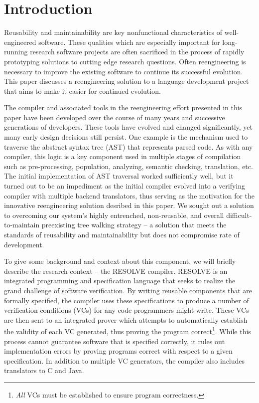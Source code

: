 \documentclass[times]{speauth}
\begin{document}

\section{Introduction}
\vspace{-2pt}
Reusability and maintainability are key nonfunctional characteristics of well-engineered software. These qualities which are especially important for long-running research software projects are often sacrificed in the process of rapidly prototyping solutions to cutting edge research questions. Often reengineering is necessary to improve the existing software to continue its successful evolution. This paper discusses a reengineering solution to a language development project that aims to make it easier for continued evolution.

The compiler and associated tools in the reengineering effort presented in this paper have been developed over the course of many years and successive generations of developers. These tools have evolved and changed significantly, yet many early design decisions still persist. One example is the mechanism used to traverse the abstract syntax tree (AST) that represents parsed code. As with any compiler, this logic is a key component used in multiple stages of compilation such as pre-processing, population, analyzing, semantic checking, translation, etc. The initial implementation of AST traversal worked sufficiently well, but it turned out to be an impediment as the initial compiler evolved into a verifying compiler with multiple backend translators, thus serving as the motivation for the innovative reengineering solution desribed in this paper. We sought out a solution to overcoming our system's highly entrenched, non-reusable, and overall difficult-to-maintain preexisting tree walking strategy -- a solution that meets the standards of reusability and maintainability but does not compromise rate of development.

To give some background and context about this component, we will briefly describe the research context -- the RESOLVE compiler. RESOLVE is an integrated programming and specification language that seeks to realize the grand challenge of software verification. By writing reusable components that are formally specified, the compiler uses these specifications to produce a number of verification conditions (VCs) for any code programmers might write. These VCs are then sent to an integrated prover which attempts to automatically establish the validity of each VC generated, thus proving the program correct\footnote{\textit{All} VCs must be established to ensure program correctness.}. While this process cannot guarantee software that is specified correctly, it rules out implementation errors by proving programs correct with respect to a given specification. In addition to multiple VC generators, the compiler also includes translators to C and Java.
\end{document}
